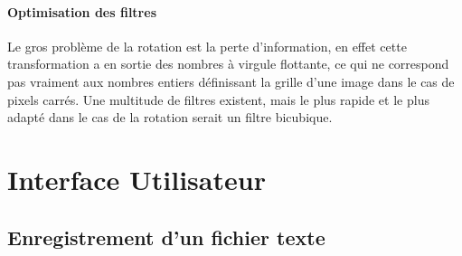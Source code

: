 \documentclass[a4paper,10pt]{report}
\begin{document}
\subsubsection{ Optimisation des filtres}
Le gros probl\`eme de la rotation est la perte d'information, en effet
cette transformation a en sortie des nombres \`a virgule flottante,
ce qui ne correspond pas vraiment aux nombres entiers d\'efinissant la
grille d'une image dans le cas de pixels carr\'es. Une multitude de
filtres existent, mais le plus rapide et le plus adapt\'e dans le cas de la
rotation serait un filtre bicubique.





















\chapter{Interface Utilisateur} %
\label{cha:interface_utilisateur}

	\section{Enregistrement d'un fichier texte} %
	\label{sec:enregistrement_d_un_fichier_texte}
\end{document}
